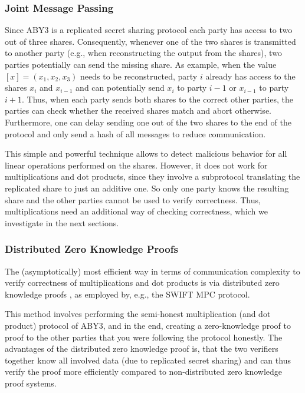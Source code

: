 \documentclass[a4paper,11pt,
]{article}
\newcommand{\shared}[1]{\ensuremath{[{#1}]}}
\begin{document}
\subsubsection{Joint Message Passing} \label{sec:jmp}

Since ABY3 is a replicated secret sharing protocol each party has access to two out of three shares. Consequently, whenever one of the two shares is transmitted to another party (e.g., when reconstructing the output from the shares), two parties potentially can send the missing share. As example, when the value $\shared{x} = (x_1, x_2, x_3)$ needs to be reconstructed, party $i$ already has access to the shares $x_i$ and $x_{i-1}$ and can potentially send $x_i$ to party $i-1$ or $x_{i-1}$ to party $i+1$. Thus, when each party sends both shares to the correct other parties, the parties can check whether the received shares match and abort otherwise. Furthermore, one can delay sending one out of the two shares to the end of the protocol and only send a hash of all messages to reduce communication.

This simple and powerful technique allows to detect malicious behavior for all linear operations performed on the shares. However, it does not work for multiplications and dot products, since they involve a subprotocol translating the replicated share to just an additive one. So only one party knows the resulting share and the other parties cannot be used to verify correctness. Thus, multiplications need an additional way of checking correctness, which we investigate in the next sections.

\subsubsection{Distributed Zero Knowledge Proofs} \label{sec:dzkp}

The (asymptotically) most efficient way in terms of communication complexity to verify correctness of multiplications and dot products is via distributed zero knowledge proofs \cite{DBLP:conf/ccs/BoyleGIN19}, as employed by, e.g., the SWIFT \cite{DBLP:conf/uss/KotiPPS21} MPC protocol.

This method involves performing the semi-honest multiplication (and dot product) protocol of ABY3, and in the end, creating a zero-knowledge proof to proof to the other parties that you were following the protocol honestly. The advantages of the distributed zero knowledge proof is, that the two verifiers together know all involved data (due to replicated secret sharing) and can thus verify the proof more efficiently compared to non-distributed zero knowledge proof systems.
\end{document}
